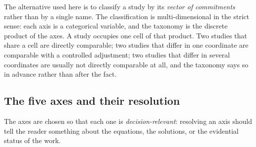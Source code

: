 The alternative used here is to classify a study by its \emph{vector of commitments} rather than by a single name. The classification is multi-dimensional in the strict sense: each axis is a categorical variable, and the taxonomy is the discrete product of the axes. A study occupies one cell of that product. Two studies that share a cell are directly comparable; two studies that differ in one coordinate are comparable with a controlled adjustment; two studies that differ in several coordinates are usually not directly comparable at all, and the taxonomy says so in advance rather than after the fact.



\subsection{The five axes and their resolution}
\label{sec:14.2}

The axes are chosen so that each one is \emph{decision-relevant}: resolving an axis should tell the reader something about the equations, the solutions, or the evidential status of the work.

